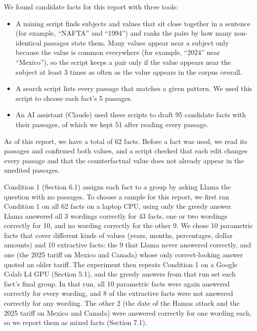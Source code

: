 \documentclass[
  12pt,
  letterpaper,
]{article}
\providecommand{\tightlist}{%
  \setlength{\itemsep}{0pt}\setlength{\parskip}{0pt}}
\begin{document}
We found candidate facts for this report with
three tools:

\begin{itemize}
\tightlist
\item
  A mining script finds subjects and values that
  sit close together in a sentence (for example,
  ``NAFTA'' and ``1994'') and ranks the pairs by
  how many non-identical passages state them. Many
  values appear near a subject only because the
  value is common everywhere (for example,
  ``2024'' near ``Mexico''), so the script keeps a
  pair only if the value appears near the subject
  at least 3 times as often as the value appears
  in the corpus overall.
\item
  A search script lists every passage that matches
  a given pattern. We used this script to choose
  each fact's 5 passages.
\item
  An AI assistant (Claude) used these scripts to
  draft 95 candidate facts with their passages, of
  which we kept 51 after reading every passage.
\end{itemize}

As of this report, we have a total of 62 facts.
Before a fact was used, we read its passages and
confirmed both values, and a script checked that
each edit changes every passage and that the
counterfactual value does not already appear in
the unedited passages.

Condition 1 (Section 6.1) assigns each fact to a
group by asking Llama the question with no
passages. To choose a sample for this report, we
first ran Condition 1 on all 62 facts on a laptop
CPU, using only the greedy answer. Llama answered
all 3 wordings correctly for 43 facts, one or two
wordings correctly for 10, and no wording
correctly for the other 9. We chose 10 parametric
facts that cover different kinds of values (years,
months, percentages, dollar amounts) and 10
extractive facts: the 9 that Llama never answered
correctly, and one (the 2025 tariff on Mexico and
Canada) whose only correct-looking answer quoted
an older tariff. The experiment then repeats
Condition 1 on a Google Colab L4 GPU (Section
5.1), and the greedy answers from that run set
each fact's final group. In that run, all 10
parametric facts were again answered correctly for
every wording, and 8 of the extractive facts were
not answered correctly for any wording. The other
2 (the date of the Hamas attack and the 2025
tariff on Mexico and Canada) were answered
correctly for one wording each, so we report them
as mixed facts (Section 7.1).
\end{document}
